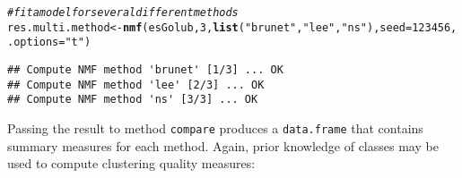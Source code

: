 \documentclass[a4paper]{article}\usepackage[]{graphicx}\usepackage[]{color}
\makeatletter
\newcommand{\hlnum}[1]{\textcolor[rgb]{0.686,0.059,0.569}{#1}}%
\newcommand{\hlstr}[1]{\textcolor[rgb]{0.192,0.494,0.8}{#1}}%
\newcommand{\hlcom}[1]{\textcolor[rgb]{0.678,0.584,0.686}{\textit{#1}}}%
\newcommand{\hlstd}[1]{\textcolor[rgb]{0.345,0.345,0.345}{#1}}%
\newcommand{\hlkwb}[1]{\textcolor[rgb]{0.69,0.353,0.396}{#1}}%
\newcommand{\hlkwc}[1]{\textcolor[rgb]{0.333,0.667,0.333}{#1}}%
\newcommand{\hlkwd}[1]{\textcolor[rgb]{0.737,0.353,0.396}{\textbf{#1}}}%
\newenvironment{kframe}{%
 \def\at@end@of@kframe{}%
 \ifinner\ifhmode%
  \def\at@end@of@kframe{\end{minipage}}%
  \begin{minipage}{\columnwidth}%
 \fi\fi%
 \def\FrameCommand##1{\hskip\@totalleftmargin \hskip-\fboxsep
 \colorbox{shadecolor}{##1}\hskip-\fboxsep
     \hskip-\linewidth \hskip-\@totalleftmargin \hskip\columnwidth}%
 \MakeFramed {\advance\hsize-\width
   \@totalleftmargin\z@ \linewidth\hsize
   \@setminipage}}%
 {\par\unskip\endMakeFramed%
 \at@end@of@kframe}
\newenvironment{knitrout}{}{} %
\let\code=\texttt
\makeatother
\begin{document}
\begin{knitrout}
\color{fgcolor}\begin{kframe}
\begin{alltt}
\hlcom{# fit a model for several different methods}
\hlstd{res.multi.method} \hlkwb{<-} \hlkwd{nmf}\hlstd{(esGolub,} \hlnum{3}\hlstd{,} \hlkwd{list}\hlstd{(}\hlstr{"brunet"}\hlstd{,} \hlstr{"lee"}\hlstd{,} \hlstr{"ns"}\hlstd{),} \hlkwc{seed} \hlstd{=} \hlnum{123456}\hlstd{,}
    \hlkwc{.options} \hlstd{=} \hlstr{"t"}\hlstd{)}
\end{alltt}
\begin{verbatim}
## Compute NMF method 'brunet' [1/3] ... OK
## Compute NMF method 'lee' [2/3] ... OK
## Compute NMF method 'ns' [3/3] ... OK
\end{verbatim}
\end{kframe}
\end{knitrout}


Passing the result to method \code{compare} produces a \code{data.frame} that contains summary measures for each method. Again, prior knowledge of classes may be used to compute clustering quality measures:  
\end{document}
